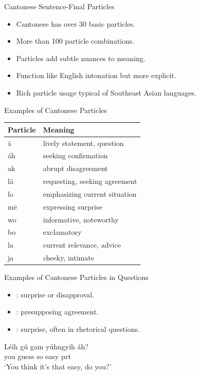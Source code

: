 \documentclass{beamer}
\newcommand{\cmn}{\mtciteform}
\begin{document}
\begin{frame}{Cantonese Sentence-Final Particles}
  \begin{itemize}
    \item Cantonese has over 30 basic particles.
    \item More than 100 particle combinations.
    \item Particles add subtle nuances to meaning.
    \item Function like English intonation but more explicit.
    \item Rich particle usage typical of Southeast Asian languages.
  \end{itemize}
\end{frame}

\begin{frame}{Examples of Cantonese Particles}
  \begin{table}[h]
    \centering
    \begin{tabular}{ll}
      \hline
      Particle & Meaning \\ \hline
      ā & lively statement, question \\ 
      áh & seeking confirmation \\ 
      ak & abrupt disagreement \\ 
      lā & requesting, seeking agreement \\ 
      lo & emphasizing current situation \\ 
      mē & expressing surprise \\
      wo & informative, noteworthy \\ 
      bo & exclamatory \\ 
      la & current relevance, advice \\ 
      ja & cheeky, intimate \\ 
    \end{tabular}
  \end{table}
\end{frame}

\begin{frame}{Examples of Cantonese Particles in Questions}
  \begin{itemize}
    \item \cmn{áh}: surprise or disapproval.
    \item \cmn{há}: presupposing agreement.
    \item \cmn{mē}: surprise, often in rhetorical questions.
  \end{itemize}
  \begin{example}
    \gll Léih gú gam yúhngyih áh? \\
         you guess so easy prt \\
    \trans ‘You think it's that easy, do you?’
  \end{example}
\end{frame}
\end{document}

